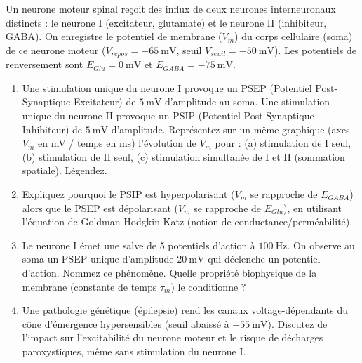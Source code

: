 \documentclass[11pt]{article}
\begin{document}
\begin{exercice}
Un neurone moteur spinal reçoit des influx de deux neurones interneuronaux distincts : le neurone I (excitateur, glutamate) et le neurone II (inhibiteur, GABA). On enregistre le potentiel de membrane ($V_m$) du corps cellulaire (soma) de ce neurone moteur ($V_{repos} = \SI{-65}{\milli\volt}$, seuil $V_{seuil} = \SI{-50}{\milli\volt}$). Les potentiels de renversement sont $E_{Glu} = \SI{0}{\milli\volt}$ et $E_{GABA} = \SI{-75}{\milli\volt}$.
\begin{enumerate}
    \item Une stimulation unique du neurone I provoque un PSEP (Potentiel Post-Synaptique Excitateur) de $\SI{5}{\milli\volt}$ d'amplitude au soma. Une stimulation unique du neurone II provoque un PSIP (Potentiel Post-Synaptique Inhibiteur) de $\SI{5}{\milli\volt}$ d'amplitude. Représentez sur un même graphique (axes $V_m$ en mV / temps en ms) l'évolution de $V_m$ pour : (a) stimulation de I seul, (b) stimulation de II seul, (c) stimulation simultanée de I et II (sommation spatiale). Légendez.
    \item Expliquez pourquoi le PSIP est hyperpolarisant ($V_m$ se rapproche de $E_{GABA}$) alors que le PSEP est dépolarisant ($V_m$ se rapproche de $E_{Glu}$), en utilisant l'équation de Goldman-Hodgkin-Katz (notion de conductance/perméabilité).
    \item Le neurone I émet une salve de 5 potentiels d'action à $\SI{100}{\Hz}$. On observe au soma un PSEP unique d'amplitude $\SI{20}{\milli\volt}$ qui déclenche un potentiel d'action. Nommez ce phénomène. Quelle propriété biophysique de la membrane (constante de temps $\tau_m$) le conditionne ?
    \item Une pathologie génétique (épilepsie) rend les canaux  voltage-dépendants du cône d'émergence hypersensibles (seuil abaissé à $\SI{-55}{\milli\volt}$). Discutez de l'impact sur l'excitabilité du neurone moteur et le risque de décharges paroxystiques, même sans stimulation du neurone I.
\end{enumerate}
\end{exercice}
\end{document}
